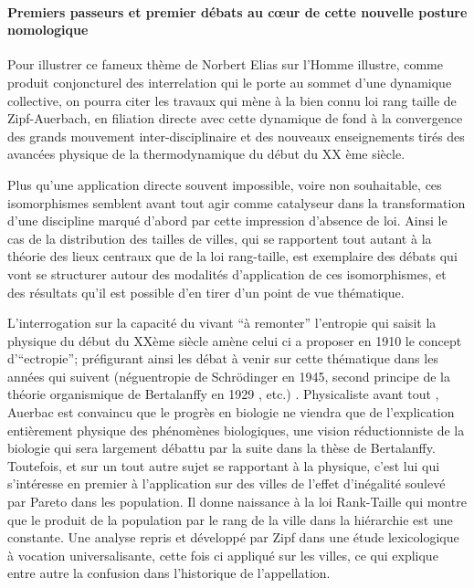 \paragraph{Premiers passeurs et premier débats au cœur de cette nouvelle posture nomologique}

Pour illustrer ce fameux thème de Norbert Elias \autocite[31-33]{Delmotte2010} \textcite{Elias1991} sur l'Homme illustre, comme produit conjoncturel des interrelation qui le porte au sommet d'une dynamique collective, on pourra citer les travaux qui mène à la bien connu loi rang taille de Zipf-Auerbach, en filiation directe avec cette dynamique de fond à la convergence des grands mouvement inter-disciplinaire et des nouveaux enseignements tirés des avancées physique de la thermodynamique du début du XX ème siècle.

Plus qu'une application directe souvent impossible, voire non souhaitable, ces isomorphismes semblent avant tout agir comme catalyseur dans la transformation d'une discipline marqué d'abord par cette impression d'absence de loi. Ainsi le cas de la distribution des tailles de villes, qui se rapportent tout autant à la théorie des lieux centraux que de la loi rang-taille, est exemplaire des débats qui vont se structurer autour des modalités d'application de ces isomorphismes, et des résultats qu'il est possible d'en tirer d'un point de vue thématique. 

L'interrogation sur la capacité du vivant \enquote{à remonter} l'entropie qui saisit la physique du début du XXème siècle amène celui ci a proposer en 1910 le concept d'\enquote{ectropie}; préfigurant ainsi les débat à venir sur cette thématique dans les années qui suivent (néguentropie de Schrödinger en 1945, second principe de la théorie organismique de Bertalanffy en 1929 \autocite[475]{Pouvreau2013}, etc.) \autocite[80]{Pouvreau2013}. Physicaliste avant tout \autocite[87]{Pouvreau2013}, Auerbac est convaincu que le progrès en biologie ne viendra que de l'explication entièrement physique des phénomènes biologiques, une vision réductionniste de la biologie qui sera largement débattu par la suite dans la thèse de Bertalanffy. Toutefois, et sur un tout autre sujet se rapportant à la physique, c'est lui qui s’intéresse en premier à l'application sur des villes de l'effet d'inégalité soulevé par Pareto dans les population.\autocite[94]{Rosser2011} Il donne naissance à la loi Rank-Taille qui montre que le produit de la population par le rang de la ville dans la hiérarchie est une constante. Une analyse repris et développé par Zipf dans une étude lexicologique à vocation universalisante, cette fois ci appliqué sur les villes, ce qui explique entre autre la confusion dans l’historique de l’appellation.

